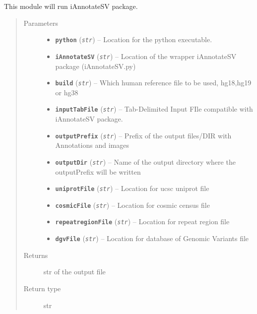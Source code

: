 \documentclass[letterpaper,10pt,english]{sphinxmanual}
\begin{document}
\begin{fulllineitems}
\label{iCallSV:iCallSV.Run_iAnnotateSV.run}
This module will run iAnnotateSV package.
\begin{quote}\begin{description}
\item[{Parameters}] \leavevmode\begin{itemize}
\item {} 
\textbf{\texttt{python}} (\emph{\texttt{str}}) -- Location for the python executable.

\item {} 
\textbf{\texttt{iAnnotateSV}} (\emph{\texttt{str}}) -- Location of the wrapper iAnnotateSV package (iAnnotateSV.py)

\item {} 
\textbf{\texttt{build}} (\emph{\texttt{str}}) -- Which human reference file to be used, hg18,hg19 or hg38

\item {} 
\textbf{\texttt{inputTabFile}} (\emph{\texttt{str}}) -- Tab-Delimited Input FIle compatible with iAnnotateSV package.

\item {} 
\textbf{\texttt{outputPrefix}} (\emph{\texttt{str}}) -- Prefix of the output files/DIR with Annotations and images

\item {} 
\textbf{\texttt{outputDir}} (\emph{\texttt{str}}) -- Name of the output directory where the outputPrefix will be written

\item {} 
\textbf{\texttt{uniprotFile}} (\emph{\texttt{str}}) -- Location for ucsc uniprot file

\item {} 
\textbf{\texttt{cosmicFile}} (\emph{\texttt{str}}) -- Location for cosmic census file

\item {} 
\textbf{\texttt{repeatregionFile}} (\emph{\texttt{str}}) -- Location for repeat region file

\item {} 
\textbf{\texttt{dgvFile}} (\emph{\texttt{str}}) -- Location for database of Genomic Variants file

\end{itemize}

\item[{Returns}] \leavevmode
str of the output file

\item[{Return type}] \leavevmode
str

\end{description}\end{quote}

\end{fulllineitems}
\end{document}
